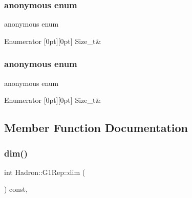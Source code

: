 \subsubsection{\texorpdfstring{anonymous enum}{anonymous enum}}
{\footnotesize\ttfamily anonymous enum}

\begin{DoxyEnumFields}{Enumerator}
[0pt][0pt]{}\mbox{\label{structHadron_1_1G1Rep_a490cd012d114ed62e3a3878f24131f81a810ee4a46e1d11c4be51e1b7f08ebe60}} 
Size\+\_\+t&\\
\hline

\end{DoxyEnumFields}
\mbox{\label{structHadron_1_1G1Rep_a490cd012d114ed62e3a3878f24131f81}} 
\subsubsection{\texorpdfstring{anonymous enum}{anonymous enum}}
{\footnotesize\ttfamily anonymous enum}

\begin{DoxyEnumFields}{Enumerator}
[0pt][0pt]{}\mbox{\label{structHadron_1_1G1Rep_a490cd012d114ed62e3a3878f24131f81a810ee4a46e1d11c4be51e1b7f08ebe60}} 
Size\+\_\+t&\\
\hline

\end{DoxyEnumFields}


\subsection{Member Function Documentation}
\mbox{\label{structHadron_1_1G1Rep_ab5e3b558f74546bd0c29b5a913aca993}} 
\subsubsection{\texorpdfstring{dim()}{dim()}\hspace{0.1cm}{\footnotesize\ttfamily [1/3]}}
{\footnotesize\ttfamily int Hadron\+::\+G1\+Rep\+::dim (\begin{DoxyParamCaption}{ }\end{DoxyParamCaption}) const\hspace{0.3cm}{\ttfamily [inline]}, {\ttfamily [virtual]}}



